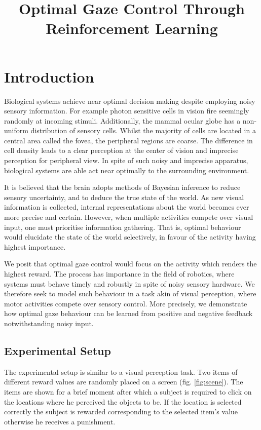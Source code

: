 \documentclass[11]{article}
\author{}
\title{Optimal Gaze Control Through Reinforcement Learning}
\begin{document}
\maketitle 	

\section{Introduction}
Biological systems achieve near optimal decision making despite employing noisy sensory information.
For example photon sensitive cells in vision fire seemingly randomly at incoming stimuli.  
Additionally, the mammal ocular globe has a non-uniform distribution of sensory cells.
Whilst the majority of cells are located in a central area called the fovea, the peripheral regions are coarse. 
The difference in cell density leads to a clear perception at the center of vision and imprecise perception for peripheral view.  
In spite of such noisy and imprecise apparatus, biological systems are able act near optimally to the surrounding environment. 

It is believed that the brain adopts methods of Bayesian inference to reduce sensory uncertainty, and to deduce the true state of the world.
As new visual information is collected, internal representations about the world becomes ever more precise and certain.
However, when multiple activities compete over visual input, one must prioritise information gathering.
That is, optimal behaviour would elucidate the state of the world selectively, in favour of the activity having highest importance.

We posit that optimal gaze control would focus on the activity which renders the highest reward.
The process has importance in the field of robotics, where systems must behave timely and robustly in spite of noisy sensory hardware.
We therefore seek to model such behaviour in a task akin of visual perception, where motor activities compete over sensory control. 
More precisely, we demonstrate how optimal gaze behaviour can be learned from positive and negative feedback notwithstanding noisy input.

\subsection{Experimental Setup}
The experimental setup is similar to a visual perception task.
Two items of different reward values are randomly placed on a screen (fig. \ref{fig:scene}).
The items are shown for a brief moment after which a subject is required to click on the locations where he perceived the objects to be. 
If the location is selected correctly the subject is rewarded corresponding to the selected item's value otherwise he receives a punishment.
\end{document}
